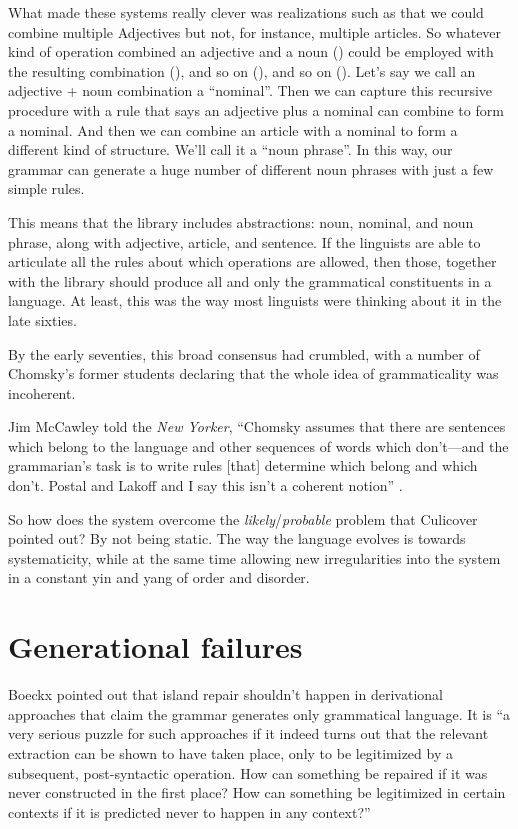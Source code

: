 What made these systems really clever was realizations such as that we could combine multiple Adjectives but not, for instance, multiple articles. So whatever kind of operation combined an adjective and a noun () could be employed with the resulting combination (), and so on (), and so on (). Let's say we call an adjective + noun combination a ``nominal''. Then we can capture this recursive procedure with a rule that says an adjective plus a nominal can combine to form a nominal. And then we can combine an article with a nominal to form a different kind of structure. We'll call it a ``noun phrase''. In this way, our grammar can generate a huge number of different noun phrases with just a few simple rules.

This means that the library includes abstractions: noun, nominal, and noun phrase, along with adjective, article, and sentence. If the linguists are able to articulate all the rules about which operations are allowed, then those, together with the library should produce all and only the grammatical constituents in a language. At least, this was the way most linguists were thinking about it in the late sixties.

By the early seventies, this broad consensus had crumbled, with a number of Chomsky's former students declaring that the whole idea of grammaticality was incoherent. \citep{Harris2021}

Jim McCawley told the \textit{New Yorker}, ``Chomsky assumes that there are sentences which belong to the language and other sequences of words which don't—and the grammarian's task is to write rules [that] determine which belong and which don't. Postal and Lakoff and I say this isn't a coherent notion'' \citep{Shenker1972}.

So how does the system overcome the \textit{likely}/\textit{probable} problem that Culicover pointed out? By not being static. The way the language evolves is towards systematicity, while at the same time allowing new irregularities into the system in a constant yin and yang of order and disorder.

\section{Generational failures}
Boeckx \citep[79]{Boeckx2012} pointed out that island repair shouldn't happen in
derivational approaches that claim the grammar generates only grammatical language. It is ``a very serious puzzle for such approaches if it indeed turns out that the relevant extraction can be shown to have taken place, only to be legitimized by a subsequent, post-syntactic operation. How can something be repaired if it was never constructed in the first place? How can something be legitimized in certain contexts if it is predicted never to happen in any context?''